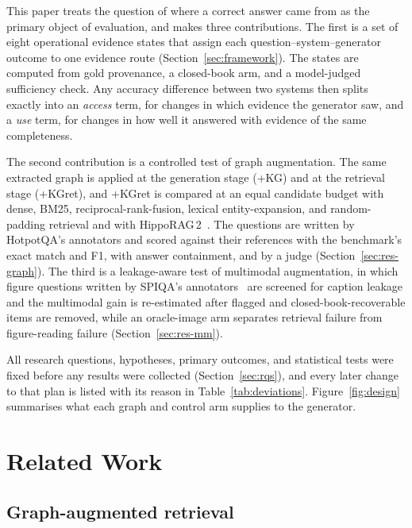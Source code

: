 \documentclass[preprint,12pt]{elsarticle}
\begin{document}
This paper treats the question of where a correct answer came from as the
primary object of evaluation, and makes three contributions. The first is a
set of eight operational evidence states that assign each
question--system--generator outcome to one evidence route
(Section~\ref{sec:framework}). The states are computed from gold provenance,
a closed-book arm, and a model-judged sufficiency check. Any accuracy
difference between two systems then splits exactly into an \emph{access}
term, for changes in which evidence the generator saw, and a \emph{use} term,
for changes in how well it answered with evidence of the same completeness.

The second contribution is a controlled test of graph augmentation. The same
extracted graph is applied at the generation stage (+KG) and at the retrieval
stage (+KGret), and +KGret is compared at an equal candidate budget with
dense, BM25, reciprocal-rank-fusion, lexical entity-expansion, and
random-padding retrieval and with HippoRAG\,2~\cite{gutierrez2025hipporag2}.
The questions are written by HotpotQA's annotators and scored against their
references with the benchmark's exact match and F1, with answer containment,
and by a judge (Section~\ref{sec:res-graph}).
The third is a leakage-aware test of multimodal augmentation, in which figure
questions written by SPIQA's annotators~\cite{spiqa} are screened for caption
leakage and the multimodal gain is re-estimated after flagged and
closed-book-recoverable items are removed, while an oracle-image arm separates
retrieval failure from figure-reading failure (Section~\ref{sec:res-mm}).

All research questions, hypotheses, primary outcomes, and statistical tests
were fixed before any results were collected (Section~\ref{sec:rqs}), and
every later change to that plan is listed with its reason in
Table~\ref{tab:deviations}.
Figure~\ref{fig:design} summarises what each graph and control arm supplies
to the generator.



\section{Related Work}
\label{sec:related}

\subsection{Graph-augmented retrieval}
\end{document}
